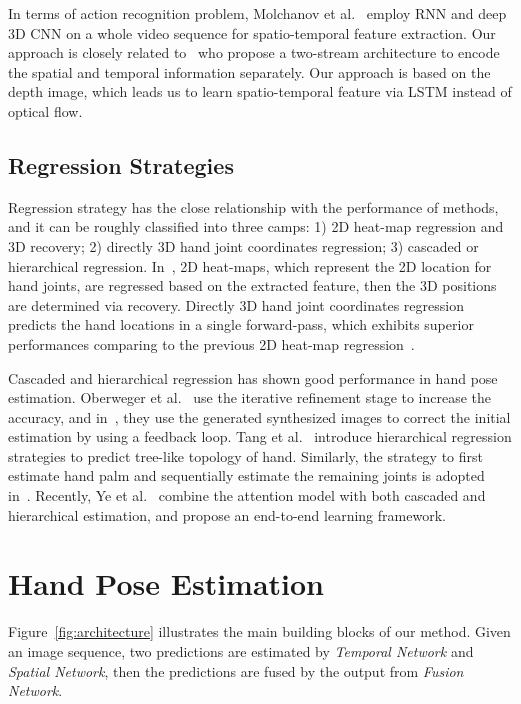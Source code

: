 \documentclass[journal,comsoc]{IEEEtran}
\begin{document}
In terms of action recognition problem, Molchanov et al.~\cite{molchanov2016online} employ RNN and deep 3D CNN on a whole
video sequence for spatio-temporal feature extraction. Our approach is closely related to~\cite{simonyan2014two}
who propose a two-stream architecture to encode the spatial and temporal information separately. Our approach
is based on the depth image, which leads us to learn spatio-temporal feature via LSTM instead of optical flow.

\subsection{Regression Strategies}\label{sec:regression}
Regression strategy has the close relationship with the performance of methods, and it can be roughly classified
into three camps: 1) 2D heat-map regression and 3D recovery; 2) directly 3D
hand joint coordinates regression; 3) cascaded or hierarchical regression. In~\cite{tompson2014real, Ge_2016_CVPR},
2D heat-maps, which represent the 2D location for hand joints, are regressed based on the extracted feature,
then the 3D positions are determined via recovery.
Directly 3D hand joint coordinates regression predicts the hand locations in a single forward-pass,
which exhibits superior performances comparing to the previous 2D heat-map regression~\cite{
zhou2016model,Ge_2017_CVPR,sinha2016deephand,deng2017hand3d,Wan_2017_CVPR,guo2017region}.

Cascaded and hierarchical regression has shown good performance in hand pose estimation. Oberweger
et al.~\cite{oberweger2015hands} use the iterative refinement stage to increase the accuracy, and
in~\cite{oberweger2015training}, they use the generated synthesized images to correct the initial
estimation by using a feedback loop. Tang et al.~\cite{tang2014latent,tang2015opening} introduce
hierarchical regression strategies to predict tree-like topology of hand. Similarly, the strategy to
first estimate hand palm and sequentially estimate the remaining joints is adopted
in~\cite{sun2015cascaded,wan2016direction}. Recently, Ye et al.~\cite{ye2016spatial} combine the
attention model with both cascaded and hierarchical estimation, and propose an end-to-end learning
framework.
\section{Hand Pose Estimation}\label{sec:hand pose estimation}
Figure~\ref{fig:architecture} illustrates the main building blocks of our method.
Given an image sequence, two predictions are estimated by \emph{Temporal Network} and \emph{Spatial Network},
then the predictions are fused by the output from \emph{Fusion Network}.
\end{document}

